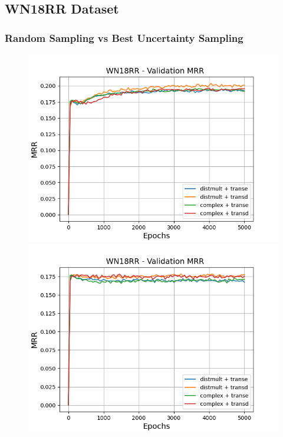 \subsection{WN18RR Dataset}

\subsubsection{Random Sampling vs Best Uncertainty Sampling}


\begin{figure}
    \centering
    \begin{minipage}{.5\textwidth}
      \centering
      \includegraphics[width=0.9\linewidth]{figures/results/gan_train/not_pretrained/random/wn18rr/gan_train_random_wn18rr_mrrs.png}
    \end{minipage}%
    \begin{minipage}{.5\textwidth}
      \centering
      \includegraphics[width=0.9\linewidth]{figures/results/gan_train/not_pretrained/uncertainty/max_distribution/entropy/wn18rr/gan_train_uncertainty_wn18rr_mrrs.png}

\end{minipage}
\end{figure}
